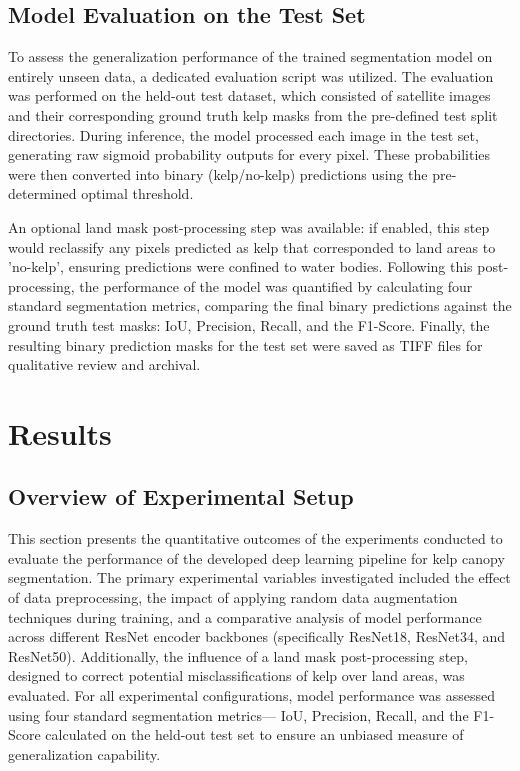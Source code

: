 \documentclass{article}
\begin{document}
\subsection{Model Evaluation on the Test Set}

To assess the generalization performance of the trained segmentation model on entirely unseen data, a dedicated evaluation script was utilized. The evaluation was performed on the held-out test dataset, which consisted of satellite images and their corresponding ground truth kelp masks from the pre-defined test split directories. During inference, the model processed each image in the test set, generating raw sigmoid probability outputs for every pixel. These probabilities were then converted into binary (kelp/no-kelp) predictions using the pre-determined optimal threshold. 

An optional land mask post-processing step was available: if enabled, this step would reclassify any pixels predicted as kelp that corresponded to land areas to 'no-kelp', ensuring predictions were confined to water bodies. Following this post-processing, the performance of the model was quantified by calculating four standard segmentation metrics, comparing the final binary predictions against the ground truth test masks: IoU, Precision, Recall, and the F1-Score. Finally, the resulting binary prediction masks for the test set were saved as TIFF files for qualitative review and archival.

\section{Results}

\subsection{Overview of Experimental Setup} %

This section presents the quantitative outcomes of the experiments conducted to evaluate the performance of the developed deep learning pipeline for kelp canopy segmentation. The primary experimental variables investigated included the effect of data preprocessing, the impact of applying random data augmentation techniques during training, and a comparative analysis of model performance across different ResNet encoder backbones (specifically ResNet18, ResNet34, and ResNet50). Additionally, the influence of a land mask post-processing step, designed to correct potential misclassifications of kelp over land areas, was evaluated. For all experimental configurations, model performance was assessed using four standard segmentation metrics— IoU, Precision, Recall, and the F1-Score calculated on the held-out test set to ensure an unbiased measure of generalization capability.
\end{document}

